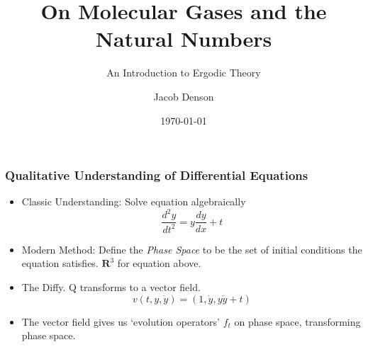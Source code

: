 \documentclass{beamer}
\title{On Molecular Gases and the Natural Numbers}
\subtitle{An Introduction to Ergodic Theory}
\author{Jacob Denson}
\institute{University of Alberta}
\date{\today}
\begin{document}
\begin{frame}
\titlepage
\end{frame}

\begin{comment}
\begin{frame}
\frametitle{The n-body problem}
\begin{columns}
\begin{column}{.6\textwidth}
\begin{itemize}
    \item<1-> Given a system of $n$ bodies (think of them as planets), solve the equation governing their motion.
    \item<2-> 1877 - Poincare/Bruns proved that 3-body solution is impossible.
    \item<3-> Can't Approximate because of Chaos.
    \item<4-> Uh Oh...
\end{itemize}
\end{column}
\begin{column}{.4\textwidth}
\texttt{[image: 3body.jpg]}
\end{column}
\end{columns}
\end{frame}
\end{comment}

\begin{frame}
\frametitle{Qualitative Understanding of Differential Equations}
\begin{itemize}
    \item<1-> Classic Understanding: Solve equation algebraically
    \[ \frac{d^2 y}{dt^2} = y \frac{dy}{dx} + t \]
    \item<3-> Modern Method: Define the {\it Phase Space} to be the set of initial conditions the equation satisfies. $\mathbf{R}^3$ for equation above.
    \item<4-> The Diffy. Q transforms to a vector field.
    \[ v(t,y,\dot{y}) = (1,\dot{y}, y \dot{y} + t) \]
    \item<5-> The vector field gives us `evolution operators' $f_t$ on phase space, transforming phase space.
\end{itemize}
\end{frame}
\end{document}
